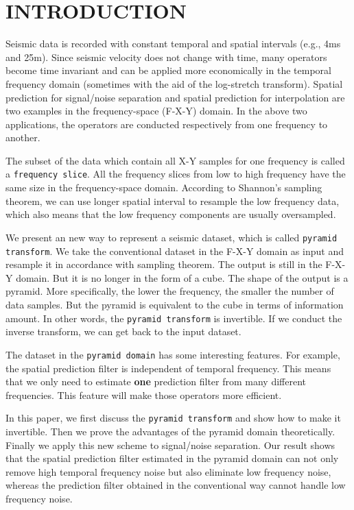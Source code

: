 \section{INTRODUCTION}
\par
Seismic data is recorded with constant temporal and spatial 
intervals (e.g., 4ms and 25m). Since seismic velocity does not change with time,
many operators become time invariant and can be applied more economically in 
the temporal frequency domain (sometimes with the aid of the log-stretch 
transform). 
Spatial prediction for signal/noise separation \cite{SEG.1984.S10.1} and
spatial prediction for interpolation \cite{GEO56.06.07850794} are two 
examples in the frequency-space (F-X-Y) domain. In the above two applications, 
the operators are conducted respectively from one frequency to another.
\par
The subset of the data which contain all X-Y samples for one frequency is
called a {\tt frequency slice}.  
All the frequency slices from low to high frequency have the same size in 
the frequency-space domain.  
According to Shannon's sampling theorem, we can use longer spatial interval 
to resample the low frequency data, which also means that the low frequency 
components are usually oversampled.
\par
We present an new way to represent a seismic dataset, which is 
called {\tt pyramid transform}. We take the conventional dataset in the F-X-Y 
domain as input and resample it in accordance with sampling theorem. The 
output is still in the F-X-Y domain. But it is no longer in the form of a cube.
The shape of the output is a pyramid. More specifically, the lower 
the frequency, the smaller the number of data samples. But the pyramid is  
equivalent to the cube in terms of information amount. In other words, the 
{\tt pyramid transform} is invertible. If we conduct the inverse transform, 
we can get back to the input dataset.
\par 
The dataset in the {\tt pyramid domain} has some interesting features. 
For example, the spatial prediction filter is independent of 
temporal frequency. This means that we only need to estimate {\bf one} 
prediction filter from many different frequencies. This feature will make 
those operators more efficient.
\par
In this paper, we first discuss the {\tt pyramid transform} and show how to 
make it invertible. Then we prove the advantages of the pyramid domain 
theoretically. Finally we apply this new scheme to signal/noise separation. 
Our result shows that the spatial prediction filter estimated in the pyramid 
domain can not only remove high temporal frequency noise but also eliminate 
low frequency noise, whereas the prediction filter obtained in the conventional
 way cannot handle low frequency noise. 

